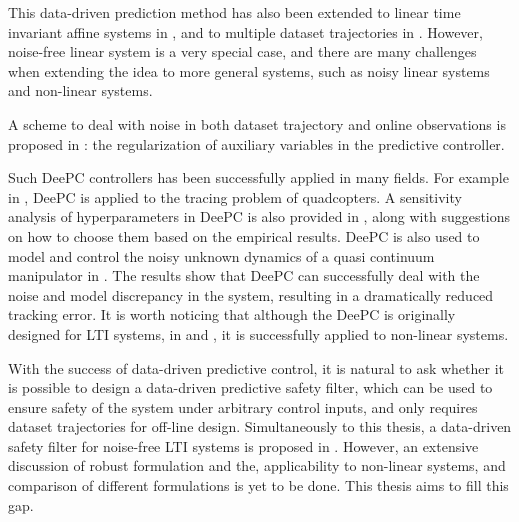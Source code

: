This data-driven prediction method has also been extended to linear time invariant affine systems in \cite{martinelliDataDrivenAffine2022}, and to multiple dataset trajectories in \cite{vanwaardeMultiple2020}.
However, noise-free linear system is a very special case, and there are many challenges when extending the idea to more general systems, such as noisy linear systems and non-linear systems.

A scheme to deal with noise in both dataset trajectory and online observations is proposed in \cite{coulsonDataenabledPredictiveControl2019}: the regularization of auxiliary variables in the predictive controller.

Such DeePC controllers has been successfully applied in many fields.
For example in \cite{elokdaDataQuad2021}, DeePC is applied to the tracing problem of quadcopters.
A sensitivity analysis of hyperparameters in DeePC is also provided in \cite{elokdaDataQuad2021}, along with suggestions on how to choose them based on the empirical results.
DeePC is also used to model and control the noisy unknown dynamics of a quasi continuum manipulator in \cite{mullerDataDrivenQCR2022}.
The results show that DeePC can successfully deal with the noise and model discrepancy in the system, resulting in a dramatically reduced tracking error.
It is worth noticing that although the DeePC is originally designed for LTI systems, in \cite{elokdaDataQuad2021} and \cite{mullerDataDrivenQCR2022}, it is successfully applied to non-linear systems.

With the success of data-driven predictive control, it is natural to ask whether it is possible to design a data-driven predictive safety filter, which can be used to ensure safety of the system under arbitrary control inputs, and only requires dataset trajectories for off-line design.
Simultaneously to this thesis, a data-driven safety filter for noise-free LTI systems is proposed in \cite{bajelaniDataDrivenSafetyFilter2023}.
However, an extensive discussion of robust formulation and the, applicability to non-linear systems, and comparison of different formulations is yet to be done.
This thesis aims to fill this gap.

